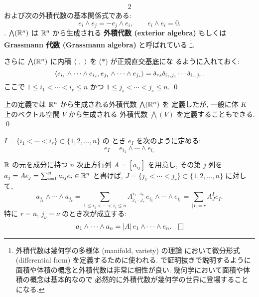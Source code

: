 \documentclass[12pt,twoside]{jarticle}
\begin{document}
\begin{definition}[外積代数]
{\begin{alignat*}{2}
    \end{alignat*}
    および次の外積代数の基本関係式である:
    \begin{equation*}
      e_i\wedge e_j = - e_j\wedge e_i, 
      \qquad
      e_i\wedge e_i = 0.
    \end{equation*}}.
  $\bigwedge({\mathbb R}^n)$ は ${\mathbb R}^n$ から生成される
  {\bf 外積代数 (exterior algebra)} もしくは 
  {\bf Grassmann 代数 (Grassmann algebra)} と呼ばれている%
  \footnote{外積代数は幾何学の多様体 (manifold, variety) の理論
    において微分形式 (differential form) を定義するために使われる.
    で証明抜きで説明するように
    面積や体積の概念と外積代数は非常に相性が良い.
    幾何学において面積や体積の概念は基本的なので
    必然的に外積代数が幾何学の世界に登場することになる.}.

  さらに $\bigwedge({\mathbb R}^n)$ に内積 $\langle\ ,\ \rangle$ を ($*$) が正規直交基底にな
  るように入れておく:
  \begin{equation*}
    \langle e_{i_1}\wedge\cdots\wedge e_{i_r},
    e_{j_1}\wedge\cdots\wedge e_{j_s}\rangle
    = \delta_{rs}\delta_{i_1,j_1}\cdots\delta_{i_r,j_r}.
  \end{equation*}
  ここで $1\le i_1<\cdots<i_r\le n$ かつ $1\le j_s<\cdots<j_s\le n$.
  \qed
\end{definition}

\begin{rem}
  上の定義では ${\mathbb R}^n$ から生成される外積代数 $\bigwedge({\mathbb R}^n)$ を
  定義したが, 一般に体 $K$ 上のベクトル空間 $V$ から生成される
  外積代数 $\bigwedge(V)$ を定義することもできる. \qed
\end{rem}


$I=\{i_1<\cdots<i_r\}\subset\{1,2,\ldots,n\}$ の
とき $e_I$ を次のように定める:
\begin{equation*}
  e_I = e_{i_1}\wedge\cdots\wedge e_{i_r}
\end{equation*}


\begin{question}[小行列式と外積代数の関係]
  \label{q:minor-wedge}
  ${\mathbb R}$ の元を成分に持つ $n$ 次正方行列 $A=[a_{ij}]$ を用意し, 
  その第 $j$ 列を $a_j = Ae_j = \sum_{i=1}^n a_{ij} e_i\in{\mathbb R}^n$ と書けば,
  $J=\{j_1<\cdots<j_r\}\subset\{1,2,\ldots,n\}$ に対して,
  \begin{equation*}
    a_{j_1}\wedge\cdots\wedge a_{j_r}
    = \sum_{1\le i_1<\cdots<i_r\le n}
    A^{i_1\ldots i_r}_{j_1\ldots j_r}
    \,e_{i_1}\wedge\cdots\wedge e_{i_r}
    = \sum_{|I|=r} A^I_J e_I.
  \end{equation*}
  特に $r=n$, $j_\nu=\nu$ のとき次が成立する:
  \begin{equation*}
    a_1\wedge\cdots\wedge a_n = |A| \,e_1\wedge\cdots\wedge e_n.
    \qed
  \end{equation*}
\end{question}
\end{document}

